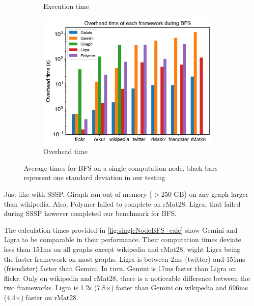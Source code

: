\begin{figure}
\begin{subfigure}{0.32\textwidth}
		\caption{Execution time}
		\label{fig:singleNodeBFS_exec}
	\end{subfigure}
	\hfil
	\begin{subfigure}{0.32\textwidth}
		\includegraphics[width=\linewidth]{../../plots/singleNodeBFS_overheadTime.png}
		\caption{Overhead time}
		\label{fig:singleNodeBFS_overheadNormalized}
	\end{subfigure}
	\caption{Average times for BFS on a single computation node, black bars represent one standard deviation in our testing}
\end{figure}
Just like with SSSP, Giraph ran out of memory ($>$250 GB) on any graph larger than wikipedia. Also, Polymer failed to complete on rMat28. Ligra, that failed during SSSP however completed our benchmark for BFS.

The calculation times provided in \autoref{fig:singleNodeBFS_calc} show Gemini and Ligra to be comparable in their performance. 
Their computation times deviate less than 151ms on all graphs except wikipedia and rMat28, wight Ligra being the faster framework on most graphs.
Ligra is between 2ms (twitter) and 151ms (friendster) faster than Gemini.
In turn, Gemini is 17ms faster than Ligra on flickr.
Only on wikipedia and rMat28, there is a noticeable difference between the two frameworks. Ligra is 1.2s (7.8$\times$) faster than Gemini on wikipedia and 696ms (4.4$\times$) faster on rMat28.

